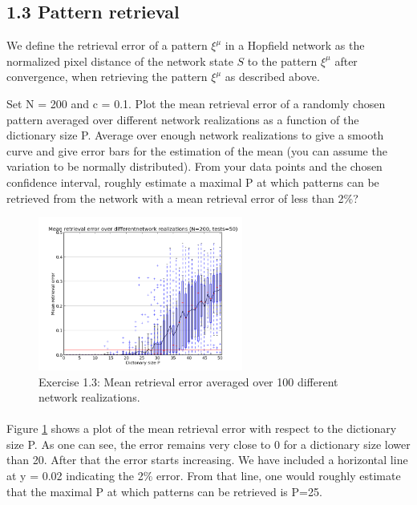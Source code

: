 \subsection{1.3 Pattern retrieval}

\begin{itshape}
\small
We define the retrieval error of a pattern $\xi^\mu$ in a Hopfield network as the normalized pixel distance of the network state $S$ to the pattern $\xi^\mu$ after convergence, when retrieving the pattern $\xi^\mu$ as described above.

Set N = 200 and c = 0.1. Plot the mean retrieval error of a randomly chosen pattern averaged over different network realizations as a function of the dictionary size P. Average over enough network realizations to give a smooth curve and give error bars for the estimation of the mean (you can assume the variation to be normally distributed). From your data points and the chosen confidence interval, roughly estimate a maximal P at which patterns can be retrieved from the network with a mean retrieval error of less than 2$\%$?

\end{itshape}

\begin{figure}
  \vspace{-20pt}
  \begin{center}
    \includegraphics[width=0.6\textwidth]{dat/ex1_3-error_avg-N200-P50-Q50.png}
  \end{center}
  \vspace{-20pt}
  \caption{Exercise 1.3: Mean retrieval error averaged over 100 different network realizations.}
  \label{fig: Question 1.3}
  \vspace{-10pt}
\end{figure}

\paragraph*{}

Figure \ref{fig: Question 1.3} shows a plot of the mean retrieval error with respect to the dictionary size P. As one can see, the error remains very close to 0 for a dictionary size lower than 20. After that the error starts increasing. We have included a horizontal line at y = 0.02 indicating the 2$\%$ error. From that line, one would roughly estimate that the maximal P at which patterns can be retrieved is P=25. 

